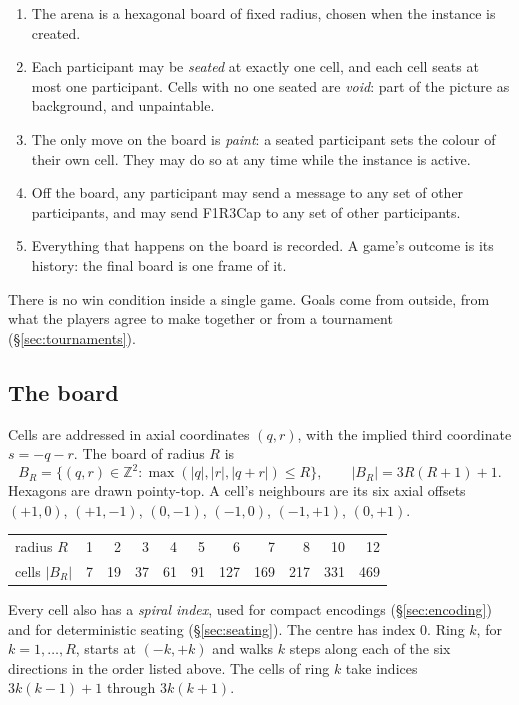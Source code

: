 \documentclass[11pt,a4paper]{article}
\begin{document}
\begin{enumerate}[leftmargin=1.4em,itemsep=3pt]
\item The arena is a hexagonal board of fixed radius, chosen when the instance is created.
\item Each participant may be \emph{seated} at exactly one cell, and each cell seats at most
  one participant. Cells with no one seated are \emph{void}: part of the picture as background,
  and unpaintable.
\item The only move on the board is \emph{paint}: a seated participant sets the colour of their
  own cell. They may do so at any time while the instance is active.
\item Off the board, any participant may send a message to any set of other participants, and
  may send F1R3Cap to any set of other participants.
\item Everything that happens on the board is recorded. A game's outcome is its history: the
  final board is one frame of it.
\end{enumerate}

There is no win condition inside a single game. Goals come from outside, from what the
players agree to make together or from a tournament (\S\ref{sec:tournaments}).

\subsection{The board}

Cells are addressed in axial coordinates $(q,r)$, with the implied third coordinate
$s=-q-r$. The board of radius $R$ is
\[
  B_R=\{(q,r)\in\mathbb{Z}^2 : \max(|q|,|r|,|q+r|)\le R\},\qquad |B_R| = 3R(R+1)+1 .
\]
Hexagons are drawn pointy-top. A cell's neighbours are its six axial offsets
$(+1,0)$, $(+1,-1)$, $(0,-1)$, $(-1,0)$, $(-1,+1)$, $(0,+1)$.

\begin{center}
\small
\begin{tabular}{@{}l*{10}{r}@{}}
\toprule
radius $R$ & 1 & 2 & 3 & 4 & 5 & 6 & 7 & 8 & 10 & 12\\
cells $|B_R|$ & 7 & 19 & 37 & 61 & 91 & 127 & 169 & 217 & 331 & 469\\
\bottomrule
\end{tabular}
\end{center}

Every cell also has a \emph{spiral index}, used for compact encodings
(\S\ref{sec:encoding}) and for deterministic seating (\S\ref{sec:seating}). The centre has index
0. Ring $k$, for $k=1,\dots,R$, starts at $(-k,+k)$ and walks $k$ steps along each of the six
directions in the order listed above. The cells of ring $k$ take indices $3k(k-1)+1$ through
$3k(k+1)$.
\end{document}
